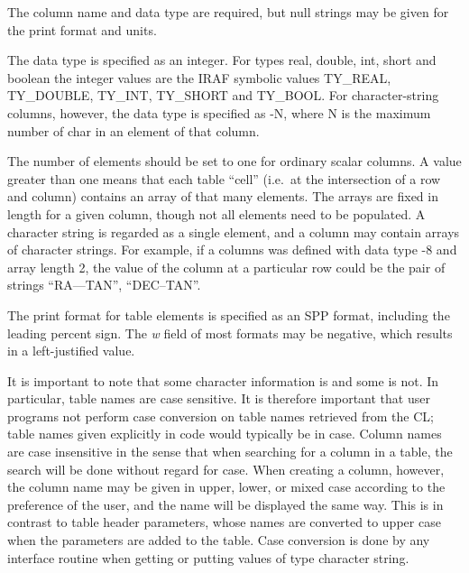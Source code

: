 The column name and data type are required,
but null strings may be given for the print format and units.

The data type is specified as an integer.
For types real, double, int, short and boolean the integer values are
the IRAF symbolic values
TY\_REAL, TY\_DOUBLE, TY\_INT, TY\_SHORT and TY\_BOOL.
For character-string columns, however, the data type is specified as -N,
where N is the maximum number of char in an element of that column.

The number of elements should be set to one for ordinary scalar columns.
A value greater than one means that each table ``cell''
(i.e.~at the intersection of a row and column)
contains an array of that many elements.
The arrays are fixed in length for a given column,
though not all elements need to be populated.
A character string is regarded as a single element,
and a column may contain arrays of character strings.
For example, if a columns was defined with data type -8
and array length 2,
the value of the column at a particular row could be
the pair of strings ``RA---TAN'', ``DEC--TAN''.

The print format for table elements is specified as an SPP format,
including the leading percent sign.
The {\it w\/} field of most formats may be negative,
which results in a left-justified value.

It is important to note that some character information is
 and some is not.
In particular, table names are case sensitive.
It is therefore important that user programs not perform
case conversion on table names retrieved from the CL;
table names given explicitly in code
would typically be in  case.
Column names are case insensitive in the sense that when searching for
a column in a table, the search will be done without regard for case.
When creating a column, however, the column name may be given in
upper, lower, or mixed case according to the preference of the user,
and the name will be displayed the same way.
This is in contrast to table header parameters, whose names are converted
to upper case when the parameters are added to the table.
Case conversion is  done by any interface routine when
getting or putting values of type character string.


